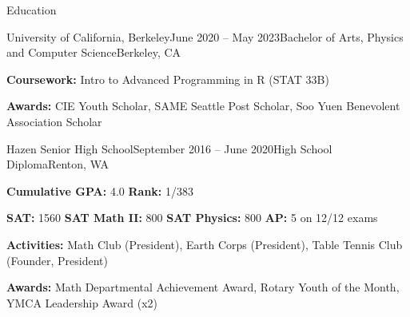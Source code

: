 \documentclass{resume} %
\begin{document}
\begin{rSection}{Education}
    \begin{rSubsection}{University of California, Berkeley}{June 2020 – May 2023}{Bachelor of Arts, Physics and Computer Science}{Berkeley, CA}
        \item {\bf Coursework:} Intro to Advanced Programming in R (STAT 33B)
        \item {\bf Awards:} CIE Youth Scholar, SAME Seattle Post Scholar, Soo Yuen Benevolent Association Scholar
        \end{rSubsection}

    \begin{rSubsection}{Hazen Senior High School}{September 2016 – June 2020}{High School Diploma}{Renton, WA}
        \item {\bf Cumulative GPA:} 4.0 {\bf Rank:} 1/383
        \item {\bf SAT:} 1560 \hspace{4mm} {\bf SAT Math II:} 800 \hspace{4mm} {\bf SAT Physics:} 800 \hspace{4mm} {\bf AP:} 5 on 12/12 exams
        \item {\bf Activities:} Math Club (President), Earth Corps (President), Table Tennis Club (Founder, President)
        \item {\bf Awards:} Math Departmental Achievement Award, Rotary Youth of the Month, YMCA Leadership Award (x2)
        \end{rSubsection}
    \end{rSection}
\end{document}
